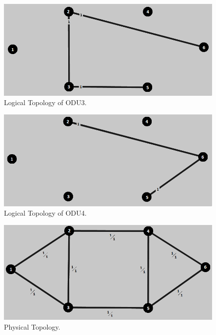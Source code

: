 \begin{figure}[H]
\centering
\includegraphics[width=13cm]{sdf/heuristic/figures/topologies/opaque_protec/low/logical_topology_odu3_low}
\caption{Logical Topology of ODU3.}
\label{logical_ODU3_protec_ref_low_heuristic}
\end{figure}

\begin{figure}[H]
\centering
\includegraphics[width=13cm]{sdf/heuristic/figures/topologies/opaque_protec/low/logical_topology_odu4_low}
\caption{Logical Topology of ODU4.}
\label{logical_ODU4_protec_ref_low_heuristic}
\end{figure}

\begin{figure}[H]
\centering
\includegraphics[width=13cm]{sdf/heuristic/figures/topologies/opaque_protec/low/physical_topology_low}
\caption{Physical Topology.}
\label{physical_topology_protec_ref_low_heuristic}
\end{figure}

